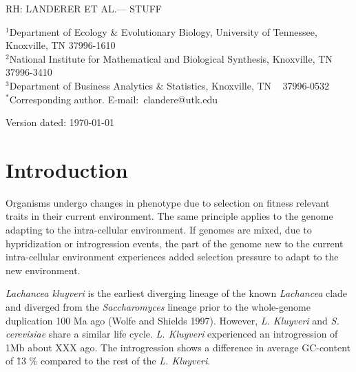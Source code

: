 \documentclass[12pt,draft]{article}
\begin{document}
\doublespacing
\linenumbers



\noindent RH: LANDERER ET AL.--- STUFF

\bigskip
\medskip
\begin{center}

\bigskip





\end{center}

\vfill

{\small
\noindent$^{1}$Department of Ecology \& Evolutionary Biology, University of Tennessee, Knoxville, TN 37996-1610\\
\noindent$^{2}$National Institute for Mathematical and Biological Synthesis, Knoxville, TN 37996-3410\\
\noindent$^{3}$Department of Business Analytics \& Statistics, Knoxville, TN ~ 37996-0532 \\
\noindent$^{*}$Corresponding author. E-mail:~clandere@utk.edu
}

\vfill
\centerline{Version dated: \today}
\vfill



\section*{Introduction}

Organisms undergo changes in phenotype due to selection on fitness relevant traits in their current environment. 
The same principle applies to the genome adapting to the intra-cellular environment.
If genomes are mixed, due to hypridization or introgression events, the part of the genome new to the current intra-cellular environment experiences added selection pressure to adapt to the new environment.

\textit{Lachancea kluyveri} is the earliest diverging lineage of the known \textit{Lachancea} clade and diverged from the \textit{Saccharomyces} lineage prior to the whole-genome duplication 100 Ma ago (Wolfe and Shields 1997). 
However, \textit{L. Kluyveri} and \textit{S. cerevisiae} share a similar life cycle.
\textit{L. Kluyveri} experienced an introgression of 1Mb about XXX ago. 
The introgression shows a difference in average GC-content of \~ 13 \% compared to the rest of the \textit{L. Kluyveri}.
\end{document}
